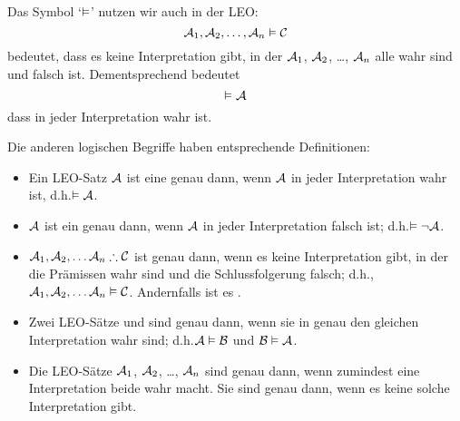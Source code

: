 Das Symbol `$\vDash$' nutzen wir auch in der LEO:
	$$\mathcal{A}_1, \mathcal{A}_2, \ldots, \mathcal{A}_n \vDash\mathcal{C}$$
bedeutet, dass es keine Interpretation gibt, in der $\mathcal{A}_1$, $\mathcal{A}_2$, \dots, $\mathcal{A}_n$ alle wahr sind und  falsch ist. Dementsprechend bedeutet
	$$\vDash\mathcal{A}$$
dass  in jeder Interpretation wahr ist.

Die anderen logischen Begriffe haben entsprechende Definitionen:

\begin{itemize}
\item Ein LEO-Satz $\mathcal{A}$ ist eine  genau dann, wenn $\mathcal{A}$ in jeder Interpretation wahr ist, d.h.\@ $\vDash\mathcal{A}$.

\item $\mathcal{A}$ ist ein  genau dann, wenn $\mathcal{A}$ in jeder Interpretation falsch ist; d.h.\@ $\vDash\neg\mathcal{A}$.
  
\item $\metav{A}_1, \metav{A}_2, \ldots \metav{A}_n \therefore \metav{C}$ ist  genau dann, wenn es keine Interpretation gibt, in der die Prämissen wahr sind und die Schlussfolgerung falsch; d.h.\@, $\mathcal{A}_1,\mathcal{A}_2,\ldots \mathcal{A}_n \vDash\mathcal{C}$. Andernfalls ist es .

\item Zwei LEO-Sätze  und  sind  genau dann, wenn sie in genau den gleichen Interpretation wahr sind; d.h.\@ $\mathcal{A}\vDash\mathcal{B}$ und $\mathcal{B}\vDash\mathcal{A}$.


\item Die LEO-Sätze $\mathcal{A}_1$, $\mathcal{A}_2$, \dots, $\mathcal{A}_n$ sind  genau dann, wenn zumindest eine Interpretation beide wahr macht. Sie sind  genau dann, wenn es keine solche Interpretation gibt.
\end{itemize}

